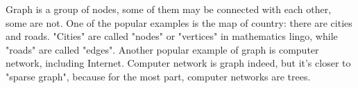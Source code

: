 
\leveldown{}

Graph is a group of nodes, some of them may be connected with each other, some are not.
One of the popular examples is the map of country: there are cities and roads.
"Cities" are called "nodes" or "vertices" in mathematics lingo, while "roads" are called "edges".
Another popular example of graph is computer network, including Internet.
Computer network is graph indeed, but it's closer to "sparse graph", because for the most part, computer networks are trees.



\levelup{}

